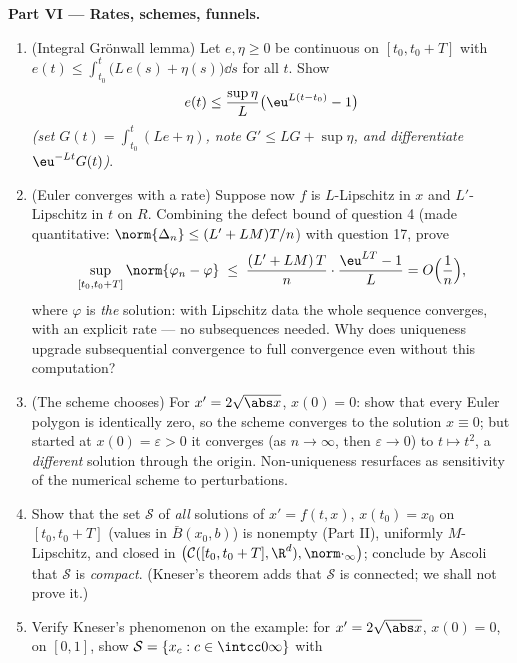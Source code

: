 \begin{problem}[{Weekend problem --- existence of solutions of
$x' = f(t, x)$ without Lipschitz}]
\medskip
\noindent\textbf{Part VI --- Rates, schemes, funnels.}
\begin{enumerate}[resume]
  \item (Integral Gr\"onwall lemma) Let $e, \eta \geq 0$ be
        continuous on $[t_0, t_0+T]$ with $e(t) \leq \int_{t_0}
        ^t\bigl(L\,e(s) + \eta(s)\bigr)\dd s$ for all $t$. Show
        \[
        e(t) \leq \frac{\sup\eta}{L}\bigl(\eu^{L(t - t_0)} -
        1\bigr)
        \]
        \emph{(set $G(t) = \int_{t_0}^t(Le + \eta)$, note $G'
        \leq LG + \sup\eta$, and differentiate
        $\eu^{-Lt}G(t)$)}.
  \item (Euler converges with a rate) Suppose now $f$ is
        $L$-Lipschitz in $x$ and $L'$-Lipschitz in $t$ on $R$.
        Combining the defect bound of question 4 (made
        quantitative: $\norm{\Delta_n} \leq (L' + LM)T/n$) with
        question 17, prove
        \[
        \sup_{[t_0, t_0+T]}\norm{\varphi_n - \varphi}
        \;\leq\; \frac{(L' + LM)\,T}{n}\cdot
        \frac{\eu^{LT} - 1}{L} = O\Bigl(\frac1n\Bigr),
        \]
        where $\varphi$ is \emph{the} solution: with Lipschitz
        data the whole sequence converges, with an explicit
        rate --- no subsequences needed. Why does uniqueness
        upgrade subsequential convergence to full convergence
        even without this computation?
  \item (The scheme chooses) For $x' = 2\sqrt{\abs x}$, $x(0) =
        0$: show that every Euler polygon is identically zero,
        so the scheme converges to the solution $x \equiv 0$;
        but started at $x(0) = \varepsilon > 0$ it converges
        (as $n \to \infty$, then $\varepsilon \to 0$) to $t
        \mapsto t^2$, a \emph{different} solution through the
        origin. Non-uniqueness resurfaces as sensitivity of the
        numerical scheme to perturbations.
  \item Show that the set $\mathcal S$ of \emph{all} solutions
        of $x' = f(t,x)$, $x(t_0) = x_0$ on $[t_0, t_0+T]$
        (values in $\bar B(x_0, b)$) is nonempty (Part II),
        uniformly $M$-Lipschitz, and closed in
        $\bigl(\mathcal C([t_0, t_0+T], \R^d),
        \norm\cdot_\infty\bigr)$; conclude by Ascoli that
        $\mathcal S$ is \emph{compact}. (Kneser's theorem adds
        that $\mathcal S$ is connected; we shall not prove
        it.)
  \item Verify Kneser's phenomenon on the example: for $x' =
        2\sqrt{\abs x}$, $x(0) = 0$, on $[0, 1]$, show
        $\mathcal S = \{x_c : c \in \intcc0\infty\}$ with

\end{enumerate}
\end{problem}

